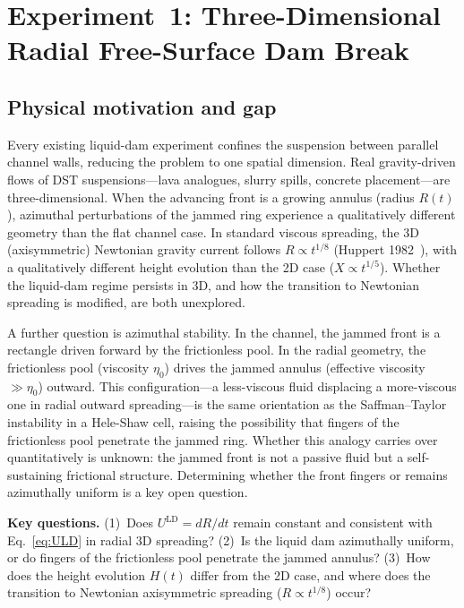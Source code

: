 \documentclass[aps,preprint,superscriptaddress,longbibliography]{revtex4-2}
\newcommand{\ULD}{{U^{\mathrm{LD}}}}
\newcommand{\etaz}{\eta_0}
\begin{document}
\section{Experiment~1: Three-Dimensional Radial Free-Surface Dam Break}
\label{sec:3Ddambreak}

\subsection{Physical motivation and gap}

Every existing liquid-dam experiment confines the suspension between parallel
channel walls, reducing the problem to one spatial dimension.  Real
gravity-driven flows of DST suspensions---lava analogues, slurry spills,
concrete placement---are three-dimensional.  When the advancing front is a
growing annulus (radius $R(t)$), azimuthal perturbations of the jammed ring
experience a qualitatively different geometry than the flat channel case.  In
standard viscous spreading, the 3D (axisymmetric) Newtonian gravity current
follows $R \propto t^{1/8}$ (Huppert 1982~\cite{Huppert1982}), with a
qualitatively different height evolution than the 2D case ($X \propto t^{1/5}$).
Whether the liquid-dam regime persists in 3D, and how the transition to
Newtonian spreading is modified, are both unexplored.

A further question is azimuthal stability.  In the channel, the jammed front
is a rectangle driven forward by the frictionless pool.  In the radial geometry,
the frictionless pool (viscosity $\etaz$) drives the jammed annulus (effective
viscosity $\gg \etaz$) outward.  This configuration---a less-viscous fluid
displacing a more-viscous one in radial outward spreading---is the same
orientation as the Saffman--Taylor instability in a Hele-Shaw cell, raising
the possibility that fingers of the frictionless pool penetrate the jammed ring.
Whether this analogy carries over quantitatively is unknown: the jammed front
is not a passive fluid but a self-sustaining frictional structure.  Determining
whether the front fingers or remains azimuthally uniform is a key open question.

\begin{mdframed}[style=questionbox]
\textbf{Key questions.}
(1)~Does $\ULD = dR/dt$ remain constant and consistent with
Eq.~\eqref{eq:ULD} in radial 3D spreading?
(2)~Is the liquid dam azimuthally uniform, or do fingers of the frictionless
pool penetrate the jammed annulus?
(3)~How does the height evolution $H(t)$ differ from the 2D case, and where
does the transition to Newtonian axisymmetric spreading
($R \propto t^{1/8}$) occur?
\end{mdframed}
\end{document}
